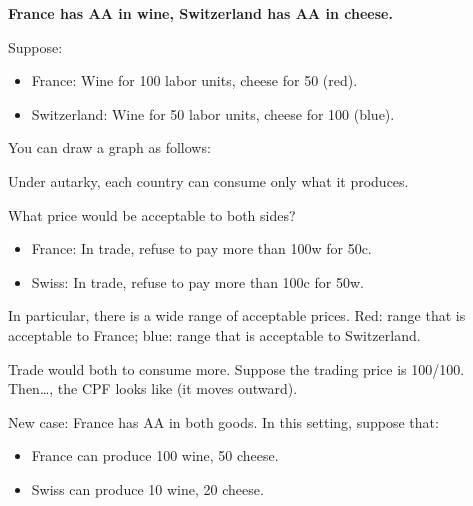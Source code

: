 \documentclass{article}
\begin{document}
  {\bf France has AA in wine, Switzerland has AA in cheese.}

  Suppose:
  \begin{itemize}
    \item France: Wine for 100 labor units, cheese for 50 (red).
    \item Switzerland: Wine for 50 labor units, cheese for 100 (blue).
  \end{itemize}

  You can draw a graph as follows:

Under autarky, each country can consume only what it produces.

What price would be acceptable to both sides?

\begin{itemize}
  \item France: In trade, refuse to pay more than 100w for 50c.
  \item Swiss: In trade, refuse to pay more than 100c for 50w.
\end{itemize}

In particular, there is a wide range of acceptable prices.  Red: range that is acceptable to France; blue: range that is acceptable to Switzerland.


Trade would both to consume more.  Suppose the trading price is 100/100.  Then\ldots, the CPF looks like (it moves outward).


New case: France has AA in both goods.  In this setting, suppose that:

\begin{itemize}
  \item France can produce 100 wine, 50 cheese.
  \item Swiss can produce 10 wine, 20 cheese.
\end{itemize}
\end{document}
